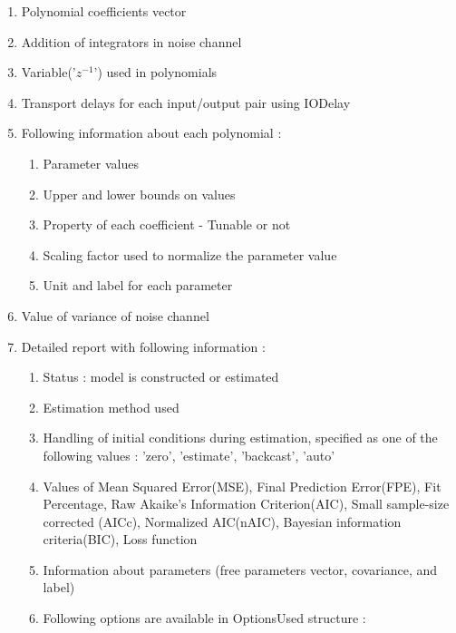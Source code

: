 \documentclass[a4paper,12pt]{report}
\begin{document}
		\begin{enumerate}	
			\item Polynomial coefficients vector
			
			\item Addition of integrators in noise channel 
			
			\item Variable('$z^{-1}$') used in polynomials
			
			\item Transport delays for each input/output pair using IODelay
		
			\item Following information about each polynomial :
		\begin{enumerate}
			
			\item Parameter values
			\item Upper and lower bounds on values
			\item Property of each coefficient - Tunable or not
			\item Scaling factor used to normalize the parameter value
			\item Unit and label for each parameter
		
		\end{enumerate}
		
		\item Value of variance of noise channel
		
		\item Detailed report with following information :  
		
		\begin{enumerate}
			\item Status : model is constructed or estimated
			\item Estimation method used 
			\item Handling of initial conditions during estimation, specified as one of the following values : 'zero', 'estimate', 'backcast', 'auto' 
			\item Values of Mean Squared Error(MSE), Final Prediction Error(FPE), Fit Percentage, Raw Akaike's Information Criterion(AIC), Small sample-size corrected (AICc), Normalized AIC(nAIC), Bayesian information criteria(BIC), Loss function
			\item Information about parameters (free parameters vector, covariance, and label) 
			\item Following options are available in OptionsUsed structure :
			

\end{enumerate}
\end{enumerate}
\end{document}
